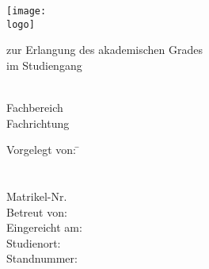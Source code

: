 \begin{titlepage}

\begin{minipage}{\textwidth}
		\noindent \hfill \texttt{[image: \\logo]}
\end{minipage}
\vspace{6em}

\begin{center}
    {\huge \art}
    
    {\Large zur Erlangung des akademischen Grades \akadGrad}\\
    {\Large im Studiengang \studiengang}
    
    \vspace{2.5em}
    
    \textbf{{\Large \titel}}
    
    \vspace{2.5em}
    
    \hochschule \\
    Fachbereich \fachbereich \\
    Fachrichtung \fachrichtung
    
    \vspace{3em}

	\begin{minipage}{\textwidth}
		\begin{tabbing}
		
		Vorgelegt von:  \hspace*{2em}\= \autor \\
		\> \strasseAutor \\
        \> \stadtAutor \\
        \> Matrikel-Nr. \matrikelnr \\
        Betreut von: \> \betreuer \\
        Eingereicht am: \> \datumAbgabe \\
        Studienort: \> \ort \\
        Standnummer: \> \standnummer
		\end{tabbing}

	\end{minipage}
\end{center}
\end{titlepage}